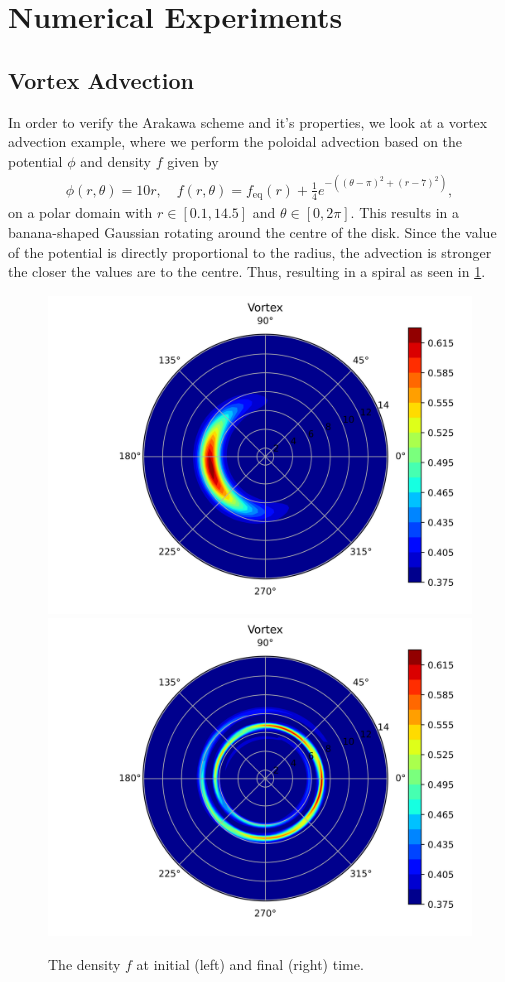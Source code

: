 

\section{Numerical Experiments}



\subsection{Vortex Advection}

In order to verify the Arakawa scheme and it's properties, we look at a vortex advection example, where we perform the poloidal advection based on the potential $\phi$ and density $f$ given by 
\begin{align}
	\phi(r, \theta)  = 10 r, \quad f(r, \theta) = f_\text{eq}(r) + \frac14 e^{- ((\theta-\pi)^2 + (r -7)^2)},
\end{align}  
on a polar domain with $r \in [0.1, 14.5]$ and $\theta \in [0, 2\pi]$. This results in a banana-shaped Gaussian rotating around the centre of the disk. Since the value of the potential is directly proportional to the radius, the advection is stronger the closer the values are to the centre. Thus, resulting in a spiral as seen in \ref{fig:vortex}.

\begin{figure}[h]
	\centering
	\includegraphics[width=0.45\linewidth]{plots/vortex_init.png}
	\includegraphics[width=0.45\linewidth]{plots/vortex_final.png}
	\caption{The density $f$ at initial (left) and final (right) time.}
	\label{fig:vortex}
\end{figure}

